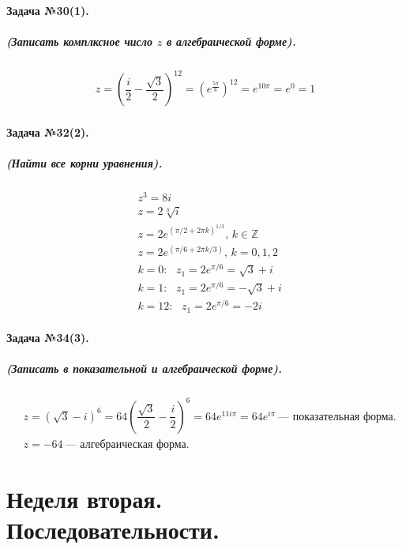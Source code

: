 \documentclass[a4paper,12pt]{report}
\begin{document}
\paragraph{Задача №30(1).}
\subparagraph{(Записать комплксное число $ z $ в алгебраической форме).}

\begin{align*}
	z=
	\left(
		\dfrac{i}{2}-\dfrac{\sqrt{3}}{2}	
	\right)^{12}=
	\left(	
		e^\frac{5\pi}{6}
	\right)^{12}=
	e^{10\pi}=e^0=1
\end{align*}

\paragraph{Задача №32(2).}
\subparagraph{(Найти все корни уравнения).}

\begin{align*}
	&z^3=8i\\
	&z=2\sqrt[3]{i}\\
	&z=2e^{(\pi /2+2\pi k)^{1/3}}
	\text{, } k \in \mathbb{Z}\\
	&z=2e^{(\pi/6+2\pi k/3)}
	\text{, }k=0,1,2\\
	&k=0: 
	\text{ }
	z_1=2e^{\pi /6}=\sqrt{3}+i\\
	&k=1: 
	\text{ }
	z_1=2e^{\pi /6}=-\sqrt{3}+i\\
	&k=12: 
	\text{ }
	z_1=2e^{\pi /6}=-2i
\end{align*}

\paragraph{Задача №34(3).}
\subparagraph{(Записать в показательной и алгебраической форме).}

\begin{align*}	
	&z=(\sqrt{3}-i)^6=
	64
	\left(
		\dfrac{\sqrt{3}}{2}-\dfrac{i}{2}
	\right)^6=
	64e^{11i\pi}=64e^{i\pi}~\text{--- показательная форма.}\\
	&z=-64~\text{--- алгебраическая форма.}
\end{align*}

\section*{Неделя вторая.\\ Последовательности.}
\end{document}

